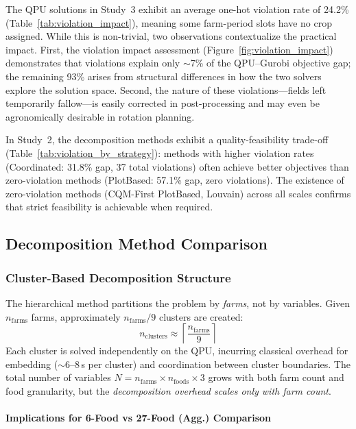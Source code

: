 The QPU solutions in Study~3 exhibit an average one-hot violation rate of 24.2\% (Table~\ref{tab:violation_impact}), meaning some farm-period slots have no crop assigned. While this is non-trivial, two observations contextualize the practical impact. First, the violation impact assessment (Figure~\ref{fig:violation_impact}) demonstrates that violations explain only $\sim$7\% of the QPU--Gurobi objective gap; the remaining 93\% arises from structural differences in how the two solvers explore the solution space. Second, the nature of these violations---fields left temporarily fallow---is easily corrected in post-processing and may even be agronomically desirable in rotation planning.

In Study~2, the decomposition methods exhibit a quality-feasibility trade-off (Table~\ref{tab:violation_by_strategy}): methods with higher violation rates (Coordinated: 31.8\% gap, 37 total violations) often achieve better objectives than zero-violation methods (PlotBased: 57.1\% gap, zero violations). The existence of zero-violation methods (CQM-First PlotBased, Louvain) across all scales confirms that strict feasibility is achievable when required.

\subsection{Decomposition Method Comparison}
\label{sec:decomposition_comparison}

\subsubsection{Cluster-Based Decomposition Structure}

The hierarchical method partitions the problem by \emph{farms}, not by variables. Given $n_{\text{farms}}$ farms, approximately $n_{\text{farms}}/9$ clusters are created:
$$n_{\text{clusters}} \approx \left\lceil \frac{n_{\text{farms}}}{9} \right\rceil$$
Each cluster is solved independently on the QPU, incurring classical overhead for embedding ($\sim$6--8\,s per cluster) and coordination between cluster boundaries. The total number of variables $N = n_{\text{farms}} \times n_{\text{foods}} \times 3$ grows with both farm count and food granularity, but the \emph{decomposition overhead scales only with farm count}.

\paragraph{Implications for 6-Food vs 27-Food (Agg.) Comparison}

